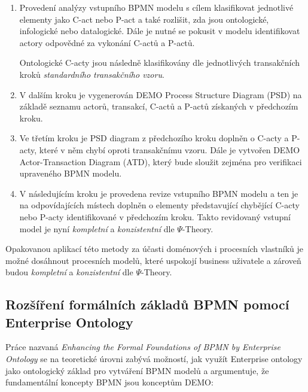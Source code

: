 \begin{enumerate}
\item Provedení analýzy vstupního BPMN modelu s cílem klasifikovat jednotlivé elementy jako C-act nebo P-act a také rozlišit, zda jsou ontologické, infologické nebo datalogické. Dále je nutné se pokusit v modelu identifikovat actory odpovědné za vykonání C-actů a P-actů.

Ontologické C-acty jsou následně klasifikovány dle jednotlivých transakčních kroků \textit{standardního transakčního vzoru}.
\item V dalším kroku je vygenerován DEMO Process Structure Diagram (PSD) na základě seznamu actorů, transakcí, C-actů a P-actů získaných v předchozím kroku.
\item Ve třetím kroku je PSD diagram z předchozího kroku doplněn o C-acty a P-acty, které v něm chybí oproti transakčnímu vzoru. Dále je vytvořen DEMO Actor-Transaction Diagram (ATD), který bude sloužit zejména pro verifikaci upraveného BPMN modelu.
\item V následujícím kroku je provedena revize vstupního BPMN modelu a ten je na odpovídajících místech doplněn o elementy představující chybějící C-acty nebo P-acty identifikované v předchozím kroku. Takto revidovaný vstupní model je nyní \textit{kompletní} a \textit{konzistentní} dle $\Psi$-Theory.
\end{enumerate}

Opakovanou aplikací této metody za účasti doménových i procesních vlastníků je možné dosáhnout procesních modelů, které uspokojí business uživatele a zároveň budou \textit{kompletní} a \textit{konzistentní} dle $\Psi$-Theory.


\subsection{Rozšíření formálních základů BPMN pomocí Enterprise Ontology}

Práce \cite{VanNuffel2009} nazvaná \textit{Enhancing the Formal Foundations of BPMN by Enterprise Ontology} se na teoretické úrovni zabývá možností, jak využít Enterprise ontology jako ontologický základ pro vytváření BPMN modelů a argumentuje, že fundamentální koncepty BPMN jsou  konceptům DEMO:

